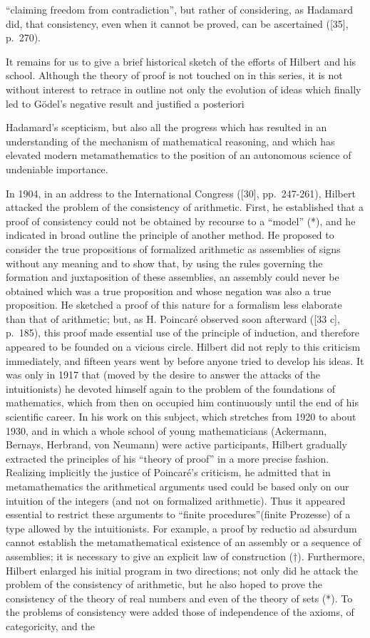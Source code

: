 ``claiming freedom from contradiction'', but rather of considering, as Hadamard did, that consistency, even when it cannot be proved, can be ascertained ({[}35{]}, p.~270).

It remains for us to give a brief historical sketch of the efforts of Hilbert and his school. Although the theory of proof is not touched on in this series, it is not without interest to retrace in outline not only the evolution of ideas which finally led to Gödel's negative result and justified a posteriori

Hadamard's scepticism, but also all the progress which has resulted in an understanding of the mechanism of mathematical reasoning, and which has elevated modern metamathematics to the position of an autonomous science of undeniable importance.

In 1904, in an address to the International Congress ({[}30{]}, pp.~247-261), Hilbert attacked the problem of the consistency of arithmetic. First, he established that a proof of consistency could not be obtained by recourse to a ``model'' (*), and he indicated in broad outline the principle of another method. He proposed to consider the true propositions of formalized arithmetic as assemblies of signs without any meaning and to show that, by using the rules governing the formation and juxtaposition of these assemblies, an assembly could never be obtained which was a true proposition and whose negation was also a true proposition. He sketched a proof of this nature for a formalism less elaborate than that of arithmetic; but, as H. Poincaré observed soon afterward ({[}33 c{]}, p.~185), this proof made essential use of the principle of induction, and therefore appeared to be founded on a vicious circle. Hilbert did not reply to this criticism immediately, and fifteen years went by before anyone tried to develop his ideas. It was only in 1917 that (moved by the desire to answer the attacks of the intuitionists) he devoted himself again to the problem of the foundations of mathematics, which from then on occupied him continuously until the end of his scientific career. In his work on this subject, which stretches from 1920 to about 1930, and in which a whole school of young mathematicians (Ackermann, Bernays, Herbrand, von Neumann) were active participants, Hilbert gradually extracted the principles of his ``theory of proof'' in a more precise fashion. Realizing implicitly the justice of Poincaré's criticism, he admitted that in metamathematics the arithmetical arguments used could be based only on our intuition of the integers (and not on formalized arithmetic). Thus it appeared essential to restrict these arguments to ``finite procedures''(finite Prozesse) of a type allowed by the intuitionists. For example, a proof by reductio ad absurdum cannot establish the metamathematical existence of an assembly or a sequence of assemblies; it is necessary to give an explicit law of construction (†). Furthermore, Hilbert enlarged his initial program in two directions; not only did he attack the problem of the consistency of arithmetic, but he also hoped to prove the consistency of the theory of real numbers and even of the theory of sets (*). To the problems of consistency were added those of independence of the axioms, of categoricity, and the 